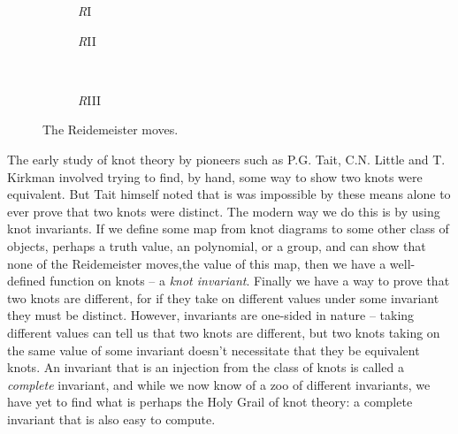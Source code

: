 \documentclass[12pt]{report}
\begin{document}
\begin{figure}[hbt!]
	\centering
	\hspace*{\fill}
	\begin{subfigure}[b]{0.35 \textwidth}
		\centering
		\def\svgscale{0.22}
		
		\caption{\textit{R}I}
	\end{subfigure}
	\hspace*{\fill}
	\begin{subfigure}[b]{0.35 \textwidth}
		\centering
		\def\svgscale{0.22}
		
		\caption{\textit{R}II}
	\end{subfigure}
	\hspace*{\fill}
	\\
	\hspace*{\fill}
	\begin{subfigure}[b]{0.35 \textwidth}
		\centering
		\def\svgscale{0.22}
		
		\caption{\textit{R}III}
	\end{subfigure}
	\hspace*{\fill}
	\caption{The Reidemeister moves.}
	\label{fig:reidemeister_moves}
\end{figure}


The early study of knot theory by pioneers such as P.G. Tait, C.N. Little and T. Kirkman involved trying to find, by hand, some way to show two knots were equivalent. But Tait himself noted that is was impossible by these means alone to ever prove that two knots were distinct. The modern way we do this is by using knot invariants. If we define some map from knot diagrams to some other class of objects, perhaps a truth value, an polynomial, or a group, and can show that none of the Reidemeister moves,the value of this map, then we have a well-defined function on knots -- a \textit{knot invariant}. Finally we have a way to prove that two knots are different, for if they take on different values under some invariant they must be distinct. However, invariants are one-sided in nature -- taking different values can tell us that two knots are different, but two knots taking on the same value of some invariant doesn't necessitate that they be equivalent knots. An invariant that is an injection from the class of knots is called a \textit{complete} invariant, and while we now know of a zoo of different invariants, we have yet to find what is perhaps the Holy Grail of knot theory: a complete invariant that is also easy to compute.
\end{document}
